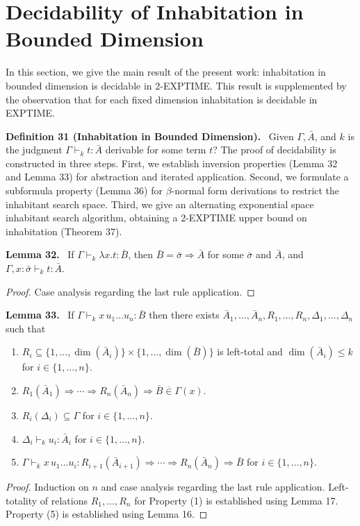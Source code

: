 \documentclass[10pt,a4paper]{article}
\newcommand{\Av}{\bar A}\newcommand{\Bv}{\bar B}\newcommand{\Cv}{\bar C}
\newcommand{\sv}{\bar\sigma}\newcommand{\tv}{\bar\tau}
\newcommand{\vin}{\mathrel{\overline{\in}}}
\newcommand{\dimn}{\operatorname{dim}}
\newcommand{\pmjudgment}[3]{#1\vdash_k #2:#3}
\newcommand{\orig}[2]{\par\medskip\noindent\textbf{#1 #2.}\ }
\begin{document}
\section*{Decidability of Inhabitation in Bounded Dimension}
In this section, we give the main result of the present work: inhabitation in bounded dimension is decidable in 2-EXPTIME. This result is supplemented by the observation that for each fixed dimension inhabitation is decidable in EXPTIME.
\orig{Definition}{31 (Inhabitation in Bounded Dimension)} Given $\Gamma,\Av$, and $k$ is the judgment $\pmjudgment\Gamma t\Av$ derivable for some term $t$?
The proof of decidability is constructed in three steps. First, we establish inversion properties (Lemma 32 and Lemma 33) for abstraction and iterated application. Second, we formulate a subformula property (Lemma 36) for $\beta$-normal form derivations to restrict the inhabitant search space. Third, we give an alternating exponential space inhabitant search algorithm, obtaining a 2-EXPTIME upper bound on inhabitation (Theorem 37).
\orig{Lemma}{32} If $\pmjudgment\Gamma{\lambda x.t}\Bv$, then $\Bv=\sv\Rightarrow\Av$ for some $\sv$ and $\Av$, and $\pmjudgment{\Gamma,x:\sv}t\Av$.
\begin{proof}Case analysis regarding the last rule application.\end{proof}
\orig{Lemma}{33} If $\pmjudgment\Gamma{x\,u_1\ldots u_n}\Bv$ then there exists $\Av_1,\ldots,\Av_n,R_1,\ldots,R_n,\Delta_1,\ldots,\Delta_n$ such that
\begin{enumerate}
\item $R_i\subseteq\{1,\ldots,\dimn(\Av_i)\}\times\{1,\ldots,\dimn(\Bv)\}$ is left-total and $\dimn(\Av_i)\leq k$ for $i\in\{1,\ldots,n\}$.
\item $R_1(\Av_1)\Rightarrow\cdots\Rightarrow R_n(\Av_n)\Rightarrow\Bv\vin\Gamma(x)$.
\item $R_i(\Delta_i)\subseteq\Gamma$ for $i\in\{1,\ldots,n\}$.
\item $\pmjudgment{\Delta_i}{u_i}{\Av_i}$ for $i\in\{1,\ldots,n\}$.
\item $\pmjudgment\Gamma{x\,u_1\ldots u_i}{R_{i+1}(\Av_{i+1})\Rightarrow\cdots\Rightarrow R_n(\Av_n)\Rightarrow\Bv}$ for $i\in\{1,\ldots,n\}$.
\end{enumerate}
\begin{proof}
Induction on $n$ and case analysis regarding the last rule application. Left-totality of relations $R_1,\ldots,R_n$ for Property (1) is established using Lemma 17. Property (5) is established using Lemma 16.
\end{proof}
\end{document}
